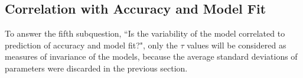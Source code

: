 \documentclass{scrartcl}
\begin{document}

\subsection{Correlation with Accuracy and Model Fit}
To answer the fifth subquestion, ``Is the variability of the model correlated to prediction of accuracy and model fit?", only the $\tau$ values will be considered as measures of invariance of the models, because the average standard deviations of parameters were discarded in the previous section.
\end{document}
